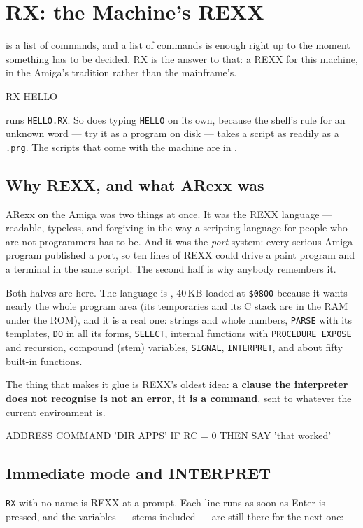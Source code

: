 \chapter{RX: the Machine's REXX}\label{cha:rx}

 is a list of commands, and a list of commands is
enough right up to the moment something has to be decided. RX is the
answer to that: a REXX for this machine, in the Amiga's tradition rather
than the mainframe's.

\begin{type}
RX HELLO
\end{type}

\noindent runs \texttt{HELLO.RX}. So does typing \verb|HELLO| on its own,
because the shell's rule for an unknown word --- try it as a program on
disk --- takes a script as readily as a \texttt{.prg}. The scripts that
come with the machine are in .

\section{Why REXX, and what ARexx was}
ARexx on the Amiga was two things at once. It was the REXX language ---
readable, typeless, and forgiving in the way a scripting language for
people who are not programmers has to be. And it was the \emph{port}
system: every serious Amiga program published a port, so ten lines of
REXX could drive a paint program and a terminal in the same script. The
second half is why anybody remembers it.

Both halves are here. The language is , 40\,KB loaded
at \texttt{\$0800} because it wants nearly the whole program area (its
temporaries and its C stack are in the RAM under the ROM), and it
is a real one: strings and whole numbers, \verb|PARSE| with its
templates, \verb|DO| in all its forms, \verb|SELECT|, internal functions
with \verb|PROCEDURE EXPOSE| and recursion, compound (stem) variables,
\verb|SIGNAL|, \verb|INTERPRET|, and about fifty built-in functions.

The thing that makes it glue is REXX's oldest idea: \textbf{a clause the
interpreter does not recognise is not an error, it is a command}, sent
to whatever the current environment is.

\begin{type}
ADDRESS COMMAND
'DIR APPS'
IF RC = 0 THEN SAY 'that worked'
\end{type}

\section{Immediate mode and INTERPRET}
\verb|RX| with no name is REXX at a prompt. Each line runs as soon as
Enter is pressed, and the variables --- stems included --- are still
there for the next one:

